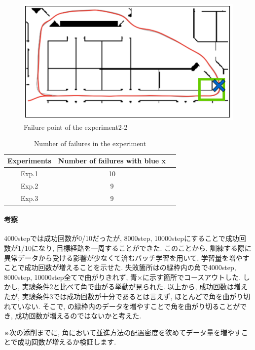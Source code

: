 \begin{figure}[h]
  \centering
  \includegraphics[keepaspectratio, scale=0.6]{images/result3.png}
  \caption{Failure point of the experiment2-2}
  \label{Fig:result3}
  \end{figure}

\begin{table}[h]
  \centering
  \begin{tabular}{|c|c|c|} \hline
    Experiments & Number of failures with blue x \\ \hline
    Exp.1 & 10 \\ \hline
    Exp.2 & 9 \\ \hline
    Exp.3 & 9 \\ \hline
  \end{tabular}
  \caption{Number of failures in the experiment}
  \label{tb:fail3}
\end{table}

\paragraph{考察}
4000stepでは成功回数が0/10だったが, 8000step, 10000stepにすることで成功回数が1/10になり, 目標経路を一周することができた. このことから, 訓練する際に異常データから受ける影響が少なくて済むバッチ学習を用いて, 学習量を増やすことで成功回数が増えることを示せた. 失敗箇所はの緑枠内の角で4000step, 8000step, 10000step全てで曲がりきれず, 青×に示す箇所でコースアウトした. しかし, 実験条件2と比べて角で曲がる挙動が見られた. 以上から, 成功回数は増えたが, 実験条件3では成功回数が十分であるとは言えず, ほとんどで角を曲がり切れていない. そこで, の緑枠内のデータを増やすことで角を曲がり切ることができ, 成功回数が増えるのではないかと考えた. 

\newpage
※次の添削までに, 角において並進方法の配置密度を狭めてデータ量を増やすことで成功回数が増えるか検証します.

